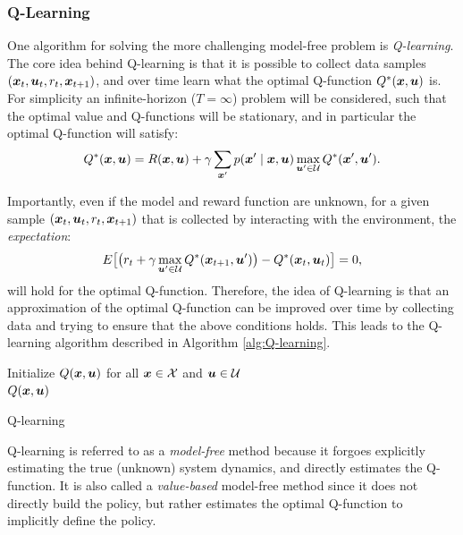 \subsubsection{Q-Learning}
One algorithm for solving the more challenging model-free problem is \textit{Q-learning}. 
The core idea behind Q-learning is that it is possible to collect data samples $(\bm{x}_t, \bm{u}_t, r_t, \bm{x}_{t+1})$, and over time learn what the optimal Q-function $Q^*(\bm{x}, \bm{u})$ is.
For simplicity an infinite-horizon ($T=\infty$) problem will be considered, such that the optimal value and Q-functions will be stationary, and in particular the optimal Q-function will satisfy:
\begin{equation*}
Q^*(\bm{x},\bm{u}) = R(\bm{x}, \bm{u}) + \gamma \sum_{\bm{x}'} p(\bm{x}' \mid \bm{x}, \bm{u}) \max_{\bm{u}'\in \mathcal{U}} Q^*(\bm{x}', \bm{u}').
\end{equation*}

Importantly, even if the model and reward function are unknown, for a given sample $(\bm{x}_t, \bm{u}_t, r_t, \bm{x}_{t+1})$ that is collected by interacting with the environment, the \textit{expectation}:
\begin{equation*}
E\big[\big(r_t + \gamma \max_{\bm{u}'\in \mathcal{U}} Q^*(\bm{x}_{t+1}, \bm{u}')\big) - Q^*(\bm{x}_t,\bm{u}_t)\big] = 0,
\end{equation*}
will hold for the optimal Q-function. Therefore, the idea of Q-learning is that an approximation of the optimal Q-function can be improved over time by collecting data and trying to ensure that the above conditions holds. This leads to the Q-learning algorithm described in Algorithm \ref{alg:Q-learning}.

\begin{algorithm}[ht]
 Initialize $Q(\bm{x}, \bm{u}) $ for all $\bm{x} \in \mathcal{X}$ and $\bm{u} \in \mathcal{U}$\\
 \Return $Q(\bm{x}, \bm{u})$
 \caption{Q-learning}
 \label{alg:Q-learning}
\end{algorithm}

Q-learning is referred to as a \textit{model-free} method because it 
forgoes explicitly estimating the true (unknown) system dynamics, and directly estimates the Q-function.
It is also called a \textit{value-based} model-free method since it does not directly build the policy, but rather estimates the optimal Q-function to implicitly define the policy.

